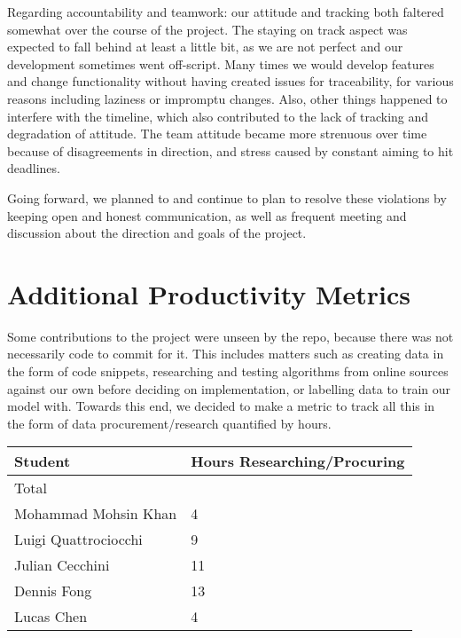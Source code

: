 \documentclass{article}
\begin{document}
Regarding accountability and teamwork: our attitude and tracking both
faltered somewhat over the course of the project. The staying on track aspect
was expected to fall behind at least a little bit, as we are not perfect and
our development sometimes went off-script. Many times we would develop features
and change functionality without having created issues for traceability, for
various reasons including laziness or impromptu changes. Also, other things
happened to interfere with the timeline, which also contributed to the lack of
tracking and degradation of attitude. The team attitude became more strenuous
over time because of disagreements in direction, and stress caused by constant
aiming to hit deadlines.

Going forward, we planned to and continue to plan to resolve these violations
by keeping open and honest communication, as well as frequent meeting and
discussion about the direction and goals of the project.

\section{Additional Productivity Metrics}

Some contributions to the project were unseen by the repo, because there was not
necessarily code to commit for it. This includes matters such as creating data 
in the form of code snippets, researching and testing algorithms from online sources
against our own before deciding on implementation, or labelling data to train our 
model with. Towards this end, we decided to make a metric to track all this 
in the form of data procurement/research quantified by hours.

\begin{table}[H]
    \centering
    \begin{tabular}{ll}
    \toprule
    \textbf{Student} & \textbf{Hours Researching/Procuring}\\
    \midrule
    Total & \\
    Mohammad Mohsin Khan & 4\\
    Luigi Quattrociocchi & 9\\
    Julian Cecchini & 11\\
    Dennis Fong & 13\\
    Lucas Chen & 4\\
    \bottomrule
    \end{tabular}
\end{table}
    
\end{document}
